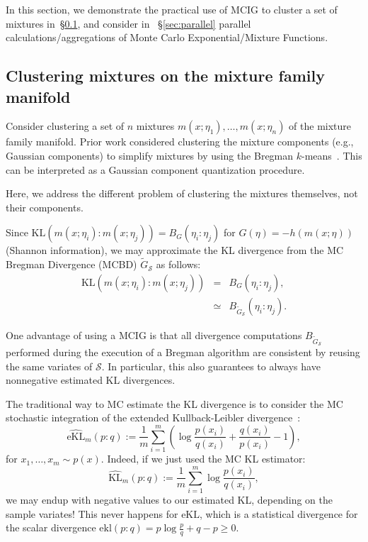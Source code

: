 \documentclass[graybox]{svmult}
\def\KL{\mathrm{KL}}
\def\ekl{\mathrm{ekl}}
\def\eqdef{:=}
\def\tildeG{\tilde{G}}
\def\calS{\mathcal{S}}
\def\eKL{\mathrm{eKL}}
\begin{document}
In this section, we demonstrate the practical use of MCIG to cluster a set of mixtures in~\S\ref{sec:clustmix}, and consider in ~\S\ref{sec:parallel} parallel calculations/aggregations of Monte Carlo Exponential/Mixture Functions.

\subsection{Clustering mixtures on the mixture family manifold}\label{sec:clustmix}
Consider clustering a set of $n$ mixtures $m(x;\eta_1),\ldots, m(x;\eta_n)$ of the mixture family manifold.
Prior work considered clustering the mixture components (e.g.,
Gaussian components) to simplify mixtures by using the Bregman
$k$-means~\cite{GaussianClustering-2007,GaussianClustering-2009}. This
can be interpreted as a Gaussian component quantization procedure.

Here, we address the different problem of clustering the mixtures themselves, not their components.

Since $\KL(m(x;\eta_i):m(x;\eta_j))=B_G(\eta_i:\eta_j)$ for $G(\eta)=-h(m(x;\eta))$ (Shannon information), we may approximate the KL divergence from the MC Bregman Divergence (MCBD) $\tildeG_\calS$ as follows:
\begin{eqnarray}
\KL(m(x;\eta_i):m(x;\eta_j))&=& B_G(\eta_i:\eta_j),\\
&\simeq&  B_{\tildeG_\calS}(\eta_i:\eta_j). %
\end{eqnarray}

One advantage of using a MCIG is that all divergence computations $B_{\tildeG_\calS}$ performed during the execution of a Bregman algorithm are consistent by reusing the same variates of $\calS$.
In particular, this also guarantees to always have nonnegative estimated KL divergences.

The traditional way to MC estimate the KL divergence is to consider the MC stochastic integration of the extended Kullback-Leibler divergence~\cite{Bregman-2005}:
\begin{equation}
\widehat{\eKL}_m(p:q) \eqdef \frac{1}{m} \sum_{i=1}^m \left(  \log \frac{p(x_i)}{q(x_i)}  + \frac{q(x_i)}{p(x_i)} -  1 \right),
\end{equation}
for $x_1,\ldots,x_m \sim p(x)$.
Indeed, if we just used the MC KL estimator:
\begin{equation}
\widehat{\KL}_m(p:q) \eqdef \frac{1}{m} \sum_{i=1}^m    \log \frac{p(x_i)}{q(x_i)},
\end{equation}
we may endup with negative values to our estimated KL, depending on the sample variates!
This never happens for $\eKL$, which is a statistical divergence for the scalar divergence $\ekl(p:q)=p\log \frac{p}{q}+q-p\geq 0$.
\end{document}
